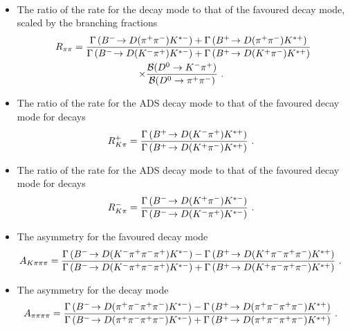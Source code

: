 \begin{itemize}
{\begin{multline}
\label{eqn:Rkk}
\end{multline}
}
\item{The ratio of the rate for the \decay{\D}{\pip\pim} decay mode to that of the favoured decay mode, scaled by the branching fractions
\begin{multline}
R_{\pi\pi} = \frac{\Gamma\left({{{B}^-}}\!\rightarrow {\ensuremath{D}}({{\pi}^+}{{\pi}^-}){{K}^{*-}}\right) + \Gamma\left({{{B}^+}}\!\rightarrow {\ensuremath{D}}({{\pi}^+}{{\pi}^-}){{K}^{*+}}\right)}{\Gamma\left({{{B}^-}}\!\rightarrow {\ensuremath{D}}({{K}^-}{{\pi}^+}){{K}^{*-}}\right) + \Gamma\left({{{B}^+}}\!\rightarrow {\ensuremath{D}}({{K}^+}{{\pi}^-}){{K}^{*+}}\right)} \\ \times \frac{{\mathcal{B}}(D^0 \rightarrow K^-\pi^+)}{{\mathcal{B}}(D^0 \rightarrow \pi^+\pi^-)} \text{ . }
\label{eqn:Rpipi}
\end{multline}}
\item{The ratio of the rate for the ADS decay mode to that of the favoured decay mode for \Bp decays
\begin{equation}
R^+_{K\pi} = \frac{\Gamma\left({{{B}^+}}\!\rightarrow {\ensuremath{D}}({{K}^-}{{\pi}^+}){{K}^{*+}}\right)}{\Gamma\left({{{B}^+}}\!\rightarrow {\ensuremath{D}}({{K}^+}{{\pi}^-}){{K}^{*+}}\right)} \text{ . }
\label{eqn:Rplus}
\end{equation}
}
\item{The ratio of the rate for the ADS decay mode to that of the favoured decay mode for \Bm decays
\begin{equation}
R^-_{K\pi} = \frac{\Gamma\left({{{B}^-}}\!\rightarrow {\ensuremath{D}}({{K}^+}{{\pi}^-}){{K}^{*-}}\right)}{\Gamma\left({{{B}^-}}\!\rightarrow {\ensuremath{D}}({{K}^-}{{\pi}^+}){{K}^{*-}}\right)} \text{ . }
\label{eqn:Rminus}
\end{equation}
}
\item{The \CP asymmetry for the favoured \decay{\Dz}{\Km\pip\pim\pip} decay mode
{\footnotesize
\begin{equation}
A_{{K}\pi\pi\pi} = \frac{\Gamma\left({{{B}^-}}\!\rightarrow {\ensuremath{D}}({{K}^-}{{\pi}^+}{{\pi}^-}{{\pi}^+}){{K}^{*-}}\right) - \Gamma\left({{{B}^+}}\!\rightarrow {\ensuremath{D}}({{K}^+}{{\pi}^-}{{\pi}^+}{{\pi}^-}){{K}^{*+}}\right)}{\Gamma\left({{{B}^-}}\!\rightarrow {\ensuremath{D}}({{K}^-}{{\pi}^+}{{\pi}^-}{{\pi}^+}){{K}^{*-}}\right) + \Gamma\left({{{B}^+}}\!\rightarrow {\ensuremath{D}}({{K}^+}{{\pi}^-}{{\pi}^+}{{\pi}^-}){{K}^{*+}}\right)} \text{ . }
\label{eqn:Akpipipi}
\end{equation}}}
\item{The \CP asymmetry for the \decay{\D}{\pip\pim\pip\pim} decay mode
{\footnotesize
\begin{equation}
A_{\pi\pi\pi\pi} = \frac{\Gamma\left({{{B}^-}}\!\rightarrow {\ensuremath{D}}({{\pi}^+}{{\pi}^-}{{\pi}^+}{{\pi}^-}){{K}^{*-}}\right) - \Gamma\left({{{B}^+}}\!\rightarrow {\ensuremath{D}}({{\pi}^+}{{\pi}^-}{{\pi}^+}{{\pi}^-}){{K}^{*+}}\right)}{\Gamma\left({{{B}^-}}\!\rightarrow {\ensuremath{D}}({{\pi}^+}{{\pi}^-}{{\pi}^+}{{\pi}^-}){{K}^{*-}}\right) + \Gamma\left({{{B}^+}}\!\rightarrow {\ensuremath{D}}({{\pi}^+}{{\pi}^-}{{\pi}^+}{{\pi}^-}){{K}^{*+}}\right)} \text{ . }
\label{eqn:Apipipipi}
\end{equation}
}}
\end{itemize}
